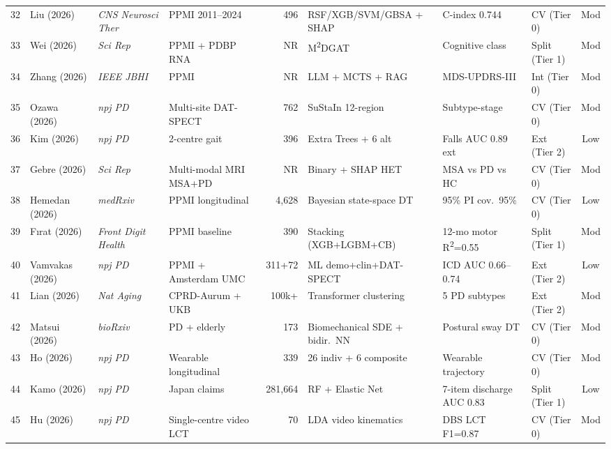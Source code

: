 \begin{landscape}
\begin{longtable}{@{}clllrlllc@{}}
32 & Liu (2026)        & \textit{CNS Neurosci Ther} & PPMI 2011--2024 & 496    & RSF/XGB/SVM/GBSA + SHAP & C-index 0.744 & CV (Tier 0)    & Mod  \\
33 & Wei (2026)        & \textit{Sci Rep}         & PPMI + PDBP RNA   & NR     & M\textsuperscript{2}DGAT & Cognitive class & Split (Tier 1) & Mod  \\
34 & Zhang (2026)      & \textit{IEEE JBHI}       & PPMI              & NR     & LLM + MCTS + RAG  & MDS-UPDRS-III      & Int (Tier 0)   & Mod  \\
35 & Ozawa (2026)      & \textit{npj PD}          & Multi-site DAT-SPECT & 762 & SuStaIn 12-region & Subtype-stage      & CV (Tier 0)    & Mod  \\
36 & Kim (2026)        & \textit{npj PD}          & 2-centre gait     & 396    & Extra Trees + 6 alt & Falls AUC 0.89 ext & Ext (Tier 2)   & Low  \\
37 & Gebre (2026)      & \textit{Sci Rep}         & Multi-modal MRI MSA+PD & NR & Binary + SHAP HET & MSA vs PD vs HC    & CV (Tier 0)    & Mod  \\
38 & Hemedan (2026)    & \textit{medRxiv}         & PPMI longitudinal & 4{,}628 & Bayesian state-space DT & 95\% PI cov.\ 95\% & CV (Tier 0)    & Low  \\
39 & F\i{}rat (2026)   & \textit{Front Digit Health} & PPMI baseline  & 390    & Stacking (XGB+LGBM+CB) & 12-mo motor R\textsuperscript{2}=0.55 & Split (Tier 1) & Mod  \\
40 & Vamvakas (2026)   & \textit{npj PD}          & PPMI + Amsterdam UMC & 311+72 & ML demo+clin+DAT-SPECT & ICD AUC 0.66--0.74 & Ext (Tier 2)   & Low  \\
41 & Lian (2026)       & \textit{Nat Aging}       & CPRD-Aurum + UKB  & 100k+  & Transformer clustering & 5 PD subtypes  & Ext (Tier 2)   & Mod  \\
42 & Matsui (2026)     & \textit{bioRxiv}         & PD + elderly      & 173    & Biomechanical SDE + bidir.\ NN & Postural sway DT & CV (Tier 0)    & Mod  \\
43 & Ho (2026)         & \textit{npj PD}          & Wearable longitudinal & 339 & 26 indiv + 6 composite & Wearable trajectory & CV (Tier 0)    & Mod  \\
44 & Kamo (2026)       & \textit{npj PD}          & Japan claims      & 281{,}664 & RF + Elastic Net & 7-item discharge AUC 0.83 & Split (Tier 1) & Low  \\
45 & Hu (2026)         & \textit{npj PD}          & Single-centre video LCT & 70 & LDA video kinematics & DBS LCT F1=0.87 & CV (Tier 0)    & Mod  \\

\end{longtable}
\end{landscape}
